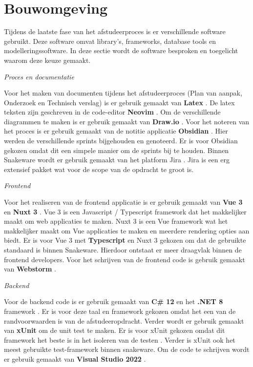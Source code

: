 \section{Bouwomgeving}
\label{section:Bouwomgeving}
Tijdens de laatste fase van het afstudeerproces is er verschillende software gebruikt.
Deze software omvat library's, frameworks, database tools en modelleringssoftware.
In deze sectie wordt de software besproken en toegelicht waarom deze keuze gemaakt.

\whitespace[2]
\textit{Proces en documentatie}

\whitespace[2]
Voor het maken van documenten tijdens het afstudeerproces (Plan van aanpak, Onderzoek en Technisch verslag) is er gebruik gemaakt van \textbf{Latex} \parencite{Latex}.
De latex teksten zijn geschreven in de code-editor \textbf{Neovim} \parencite{NeoVim}.
Om de verschillende diagrammen te maken is er gebruik gemaakt van \textbf{Draw.io} \parencite{Drawio}.
Voor het noteren van het proces is er gebruik gemaakt van de notitie applicatie \textbf{Obsidian} \parencite{Obsidian}.
Hier werden de verschillende sprints bijgehouden en genoteerd.
Er is voor Obsidian gekozen omdat dit een simpele manier om de sprints bij te houden.
Binnen Snakeware wordt er gebruik gemaakt van het platform Jira \parencite{Jira}.
Jira is een erg extensief pakket wat voor de scope van de opdracht te groot is.

\whitespace[2]
\textit{Frontend}

\whitespace[2]
Voor het realiseren van de frontend applicatie is er gebruik gemaakt van \textbf{Vue 3} \parencite{Vue} en \textbf{Nuxt 3} \parencite{Nuxt}.
Vue 3 is een Javascript \parencite{JavaScript} / Typescript \parencite{Typescript} framework dat het makkelijker maakt om web applicaties te maken.
Nuxt 3 is een Vue framework wat het makkelijker maakt om Vue applicaties te maken en meerdere rendering opties aan biedt.
Er is voor Vue 3 met \textbf{Typescript} en Nuxt 3 gekozen om dat de gebruikte standaard is binnen Snakeware.
Hierdoor ontstaat er meer draagvlak binnen de frontend developers.
Voor het schrijven van de frontend code is gebruik gemaakt van \textbf{Webstorm} \parencite{Webstorm}.

\newpage

\whitespace[2]
\textit{Backend}

\whitespace[2]
Voor de backend code is er gebruik gemaakt van \textbf{C\# 12} \parencite{CSharp} en het \textbf{.NET 8} framework \parencite{DotNet8}.
Er is voor deze taal en framework gekozen omdat het een van de randvoorwaarden is van de afstudeeropdracht.
Verder wordt er gebruik gemaakt van \textbf{xUnit} \parencite{xUnit} om de unit test te maken.
Er is voor xUnit gekozen omdat dit framework het beste is in het isoleren van de testen \parencite{IsolationTest}. 
Verder is xUnit ook het meest gebruikte test-framework binnen snakeware.
Om de code te schrijven wordt er gebruik gemaakt van \textbf{Visual Studio 2022} \parencite{VisualStudio}.

